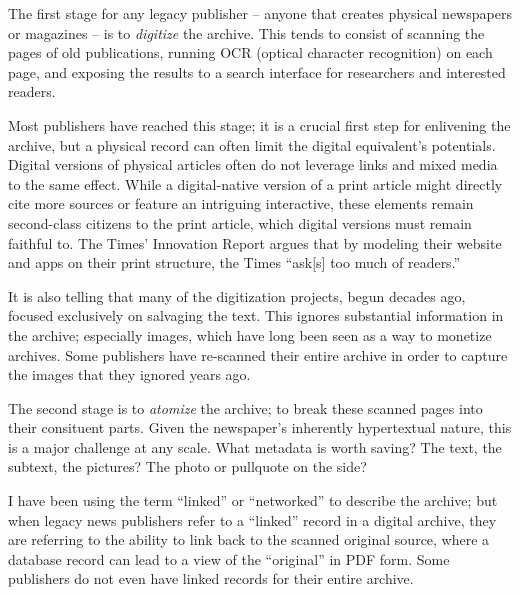 The first stage for any legacy publisher -- anyone that creates physical newspapers or magazines -- is to \emph{digitize} the archive. This tends to consist of scanning the pages of old publications, running OCR (optical character recognition) on each page, and exposing the results to a search interface for researchers and interested readers.

Most publishers have reached this stage; it is a crucial first step for enlivening the archive, but a physical record can often limit the digital equivalent's potentials. Digital versions of physical articles often do not leverage links and mixed media to the same effect. While a digital-native version of a print article might directly cite more sources or feature an intriguing interactive, these elements remain second-class citizens to the print article, which digital versions must remain faithful to. The Times' Innovation Report argues that by modeling their website and apps on their print structure, the Times ``ask[s] too much of readers.''


It is also telling that many of the digitization projects, begun decades ago, focused exclusively on salvaging the text. This ignores substantial information in the archive; especially images, which have long been seen as a way to monetize archives. %
Some publishers have re-scanned their entire archive in order to capture the images that they ignored years ago.  %

The second stage is to \emph{atomize} the archive; to break these scanned pages into their consituent parts. Given the newspaper's inherently hypertextual nature, this is a major challenge at any scale. What metadata is worth saving? The text, the subtext, the pictures? The photo or pullquote on the side?

I have been using the term ``linked'' or ``networked'' to describe the archive; but when legacy news publishers refer to a ``linked'' record in a digital archive, they are referring to the ability to link back to the scanned original source, where a database record can lead to a view of the ``original'' in PDF form. Some publishers do not even have linked records for their entire archive.

